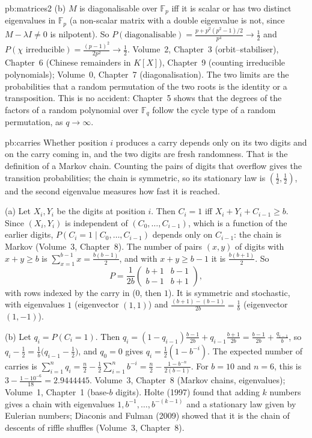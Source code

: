 \begin{solution}{pb:matrices2}
(b) $M$ is diagonalisable over $\mathbb F_p$ iff it is scalar or has two distinct eigenvalues in $\mathbb F_p$ (a non-scalar
matrix with a double eigenvalue is not, since $M-\lambda I\ne0$ is nilpotent). So
$P(\text{diagonalisable})=\frac{p+p^2(p^2-1)/2}{p^4}\to\frac12$ and $P(\chi\text{ irreducible})=\frac{(p-1)^2}{2p^2}\to\frac12$.
\tools Volume~2, Chapter~3 (orbit--stabiliser), Chapter~6 (Chinese remainders in $K[X]$), Chapter~9 (counting irreducible
polynomials); Volume~0, Chapter~7 (diagonalisation).
\leads The two limits are the probabilities that a random permutation of the two roots is the identity or a transposition.
This is no accident: Chapter~5 shows that the degrees of the factors of a random polynomial over $\mathbb F_q$ follow the cycle
type of a random permutation, as $q\to\infty$.
\end{solution}

\begin{solution}{pb:carries}
\idea Whether position $i$ produces a carry depends only on its two digits and on the carry coming in, and the two digits
are fresh randomness. That is the definition of a Markov chain. Counting the pairs of digits that overflow gives the
transition probabilities; the chain is symmetric, so its stationary law is $(\frac12,\frac12)$, and the second eigenvalue
measures how fast it is reached.

\writeup (a) Let $X_i,Y_i$ be the digits at position $i$. Then $C_i=1$ iff $X_i+Y_i+C_{i-1}\ge b$. Since $(X_i,Y_i)$ is
independent of $(C_0,\dots,C_{i-1})$, which is a function of the earlier digits, $P(C_i=1\mid C_0,\dots,C_{i-1})$ depends only
on $C_{i-1}$: the chain is Markov (Volume~3, Chapter~8). The number of pairs $(x,y)$ of digits with $x+y\ge b$ is
$\sum_{x=1}^{b-1}x=\frac{b(b-1)}2$, and with $x+y\ge b-1$ it is $\frac{b(b+1)}2$. So
\[
P=\frac1{2b}\begin{pmatrix}b+1&b-1\\b-1&b+1\end{pmatrix},
\]
with rows indexed by the carry in ($0$, then $1$). It is symmetric and stochastic, with eigenvalues $1$ (eigenvector
$(1,1)$) and $\frac{(b+1)-(b-1)}{2b}=\frac1b$ (eigenvector $(1,-1)$).

(b) Let $q_i=P(C_i=1)$. Then $q_i=(1-q_{i-1})\frac{b-1}{2b}+q_{i-1}\frac{b+1}{2b}=\frac{b-1}{2b}+\frac{q_{i-1}}b$, so
$q_i-\frac12=\frac1b\bigl(q_{i-1}-\frac12\bigr)$, and $q_0=0$ gives $q_i=\frac12(1-b^{-i})$. The expected number of carries
is $\sum_{i=1}^nq_i=\frac n2-\frac12\sum_{i=1}^nb^{-i}=\frac n2-\frac{1-b^{-n}}{2(b-1)}$. For $b=10$ and $n=6$, this is
$3-\frac{1-10^{-6}}{18}=2.9444445$.
\tools Volume~3, Chapter~8 (Markov chains, eigenvalues); Volume~1, Chapter~1 (base-$b$ digits).
\leads Holte (1997) found that adding $k$ numbers gives a chain with eigenvalues $1,b^{-1},\dots,b^{-(k-1)}$ and a stationary law
given by Eulerian numbers; Diaconis and Fulman (2009) showed that it is the chain of descents of riffle shuffles
(Volume~3, Chapter~8).
\end{solution}

